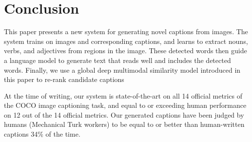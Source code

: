 \documentclass[10pt,twocolumn,letterpaper]{article}
\begin{document}
\section{Conclusion}\label{sec:conclusion}

This paper presents a new system for generating novel captions from images. The system trains on images and corresponding captions, and learns to extract nouns, verbs, and adjectives from regions in the image. These detected words then guide a language model to generate text that reads well and includes the detected words. Finally, we use a global deep multimodal similarity model introduced in this paper to re-rank candidate captions

At the time of writing, our system is state-of-the-art on all 14 official metrics of the COCO image captioning task, and equal to or exceeding human performance on 12 out of the 14 official metrics. Our generated captions have been judged by humans (Mechanical Turk workers) to be equal to or better than human-written captions 34\% of the time.

{\small}
\end{document}
